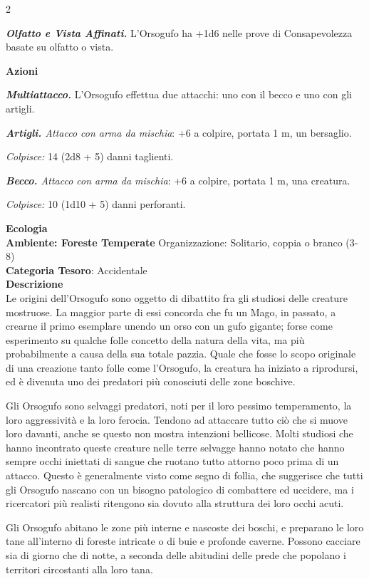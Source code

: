 \begin{multicols}{2}
{\emph{\textbf{Olfatto e Vista Affinati.}} L'Orsogufo ha +1d6 nelle prove di Consapevolezza basate su olfatto o vista.

\textbf{Azioni}

\emph{\textbf{Multiattacco.}} L'Orsogufo effettua due attacchi: uno con il becco e uno con gli artigli.

\emph{\textbf{Artigli.} Attacco con arma da mischia}: +6 a colpire, portata 1 m, un bersaglio.

\emph{Colpisce:} 14 (2d8 + 5) danni taglienti.

\emph{\textbf{Becco.} Attacco con arma da mischia}: +6 a colpire, portata 1 m, una creatura.

\emph{Colpisce:} 10 (1d10 + 5) danni perforanti.

\textbf{Ecologia}\\
\textbf{Ambiente: Foreste Temperate}
Organizzazione: Solitario, coppia o branco (3-8)\\
\textbf{Categoria Tesoro}: Accidentale\\
\textbf{Descrizione}\\
Le origini dell'Orsogufo sono oggetto di dibattito fra gli studiosi delle creature mostruose. La maggior parte di essi concorda che fu un Mago, in passato, a crearne il primo esemplare unendo un orso con un gufo gigante; forse come esperimento su qualche folle concetto della natura della vita, ma più probabilmente a causa della sua totale pazzia. Quale che fosse lo scopo originale di una creazione tanto folle come l'Orsogufo, la creatura ha iniziato a riprodursi, ed è divenuta uno dei predatori più conosciuti delle zone boschive.

Gli Orsogufo sono selvaggi predatori, noti per il loro pessimo temperamento, la loro aggressività e la loro ferocia. Tendono ad attaccare tutto ciò che si muove loro davanti, anche se questo non mostra intenzioni bellicose. Molti studiosi che hanno incontrato queste creature nelle terre selvagge hanno notato che hanno sempre occhi iniettati di sangue che ruotano tutto attorno poco prima di un attacco. Questo è generalmente visto come segno di follia, che suggerisce che tutti gli Orsogufo nascano con un bisogno patologico di combattere ed uccidere, ma i ricercatori più realisti ritengono sia dovuto alla struttura dei loro occhi acuti.

Gli Orsogufo abitano le zone più interne e nascoste dei boschi, e preparano le loro tane all'interno di foreste intricate o di buie e profonde caverne. Possono cacciare sia di giorno che di notte, a seconda delle abitudini delle prede che popolano i territori circostanti alla loro tana.

}
\end{multicols}
